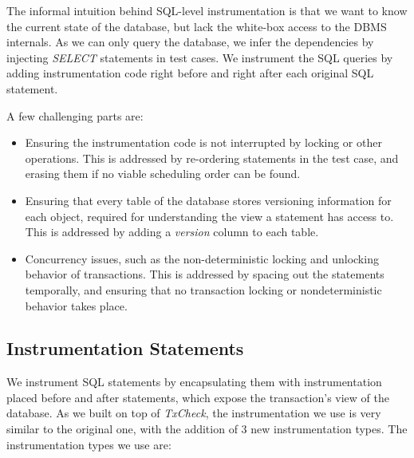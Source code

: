 The informal intuition behind SQL-level instrumentation is that we want to know the current state of the database, but lack the white-box access to the DBMS internals. As we can only query the database, we infer the dependencies by injecting \textit{SELECT} statements in test cases. We instrument the SQL queries by adding instrumentation code right before and right after each original SQL statement.

A few challenging parts are:

\begin{itemize}
    \item Ensuring the instrumentation code is not interrupted by locking or other operations. This is addressed by re-ordering statements in the test case, and erasing them if no viable scheduling order can be found.
    \item Ensuring that every table of the database stores versioning information for each object, required for understanding the view a statement has access to. This is addressed by adding a \textit{version} column to each table.
    \item Concurrency issues, such as the non-deterministic locking and unlocking behavior of transactions. This is addressed by spacing out the statements temporally, and ensuring that no transaction locking or nondeterministic behavior takes place.
\end{itemize}


\subsection{Instrumentation Statements}

We instrument SQL statements by encapsulating them with instrumentation placed before and after statements, which expose the transaction's view of the database. As we built on top of \textit{TxCheck}, the instrumentation we use is very similar to the original one, with the addition of $3$ new instrumentation types. The instrumentation types we use are:

